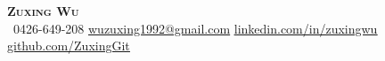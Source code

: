 \begin{center}
    \textbf{\Huge \scshape Zuxing Wu} \\ \vspace{1pt}
     \ \small 0426-649-208 \quad
    \href{mailto:wuzuxing1992@gmail.com}{ \underline{wuzuxing1992@gmail.com}} \quad
    \href{https://www.linkedin.com/in/zuxingwu/}{ \underline{linkedin.com/in/zuxingwu}} \quad
    \href{https://github.com/ZuxingGit}{ \underline{github.com/ZuxingGit}}
\end{center}